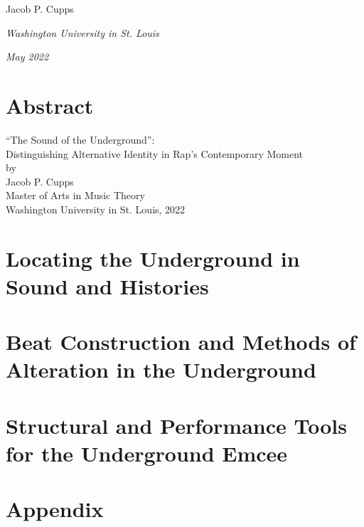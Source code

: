 \documentclass[12pt]{report}
\begin{document}
\vspace{0.2cm}
\hfill{Jacob P. Cupps}

\noindent \textit{Washington University in St. Louis}

\noindent \textit{May 2022}

    \chapter*{Abstract}
    
    \begin{center}
        \large ``The Sound of the Underground'': \\
        \large Distinguishing Alternative Identity in Rap's Contemporary Moment  \\
        \normalsize by \\
        Jacob P. Cupps \\
        Master of Arts in Music Theory \\
        
        Washington University in St. Louis, 2022 \\
    \end{center}
    
    \lipsum[0-1]

\chapter{Locating the Underground in Sound and Histories}


\chapter{Beat Construction and Methods of Alteration in the Underground}


\chapter{Structural and Performance Tools for the Underground Emcee}


%


\singlespacing
\printbibliography
{}
\nocite{*}

\chapter*{Appendix}

\end{document}
